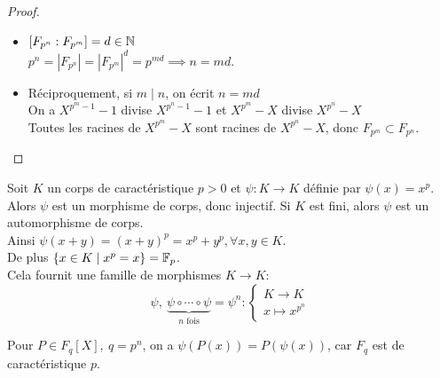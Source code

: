 \begin{proof}
	\begin{itemize}
		\item $[ F_{p^n} : F_{p^m} ] = d \in \mathbb{N}$\\
		      $p^n = |F_{p^n}| = |F_{p^m}|^d = p^{md} \implies n = md$.

		\item Réciproquement, si $m \mid n$, on écrit $n = md$\\
		      On a $X^{p^m - 1} - 1$ divise $X^{p^n-1} - 1$  et $X^{p^m} - X$ divise $X^{p^n} - X$\\
		      Toutes les racines de $X^{p^m} - X$ sont racines de $X^{p^n} - X$, donc $F_{p^m} \subset F_{p^n}$.
	\end{itemize}
\end{proof}



\begin{remarque}
	Soit $K$ un corps de caractéristique $p >0$ et $\psi : K \to K$ définie par $\psi(x) = x^p$.\\
	Alors $\psi$ est un morphisme de corps, donc injectif. Si $K$ est fini, alors $\psi$ est un automorphisme de corps.\\
	Ainsi $\psi(x + y) = (x+y)^p = x^p + y^p, \forall x,y \in K$.\\
	De plus $\left\{x \in K \mid x^p = x\right\} = \mathbb{F}_p$.\\
	Cela fournit une famille de morphismes $K \to K$:
	$$ \psi,\ \underbrace{\psi \circ \cdots \circ \psi}_{n \text{ fois}} = \psi^n : \begin{cases}
			K \to K \\
			x \mapsto x^{p^n}
		\end{cases}$$

	Pour $P \in F_q[X], \ q = p^n$, on a $\psi(P(x)) = P (\psi(x))$, car $F_q$ est de caractéristique $p$.
\end{remarque}




